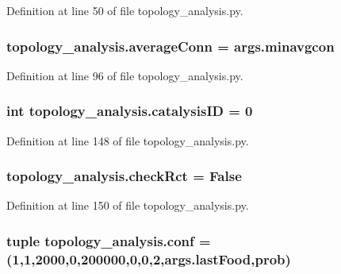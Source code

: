 Definition at line 50 of file topology\-\_\-analysis.\-py.

\hypertarget{a00157_a0d59133b2bb42e7aa26a3dba3a2a9a70}{
\subsubsection[{average\-Conn}]{\setlength{\rightskip}{0pt plus 5cm}topology\-\_\-analysis.\-average\-Conn = args.\-minavgcon}}\label{a00157_a0d59133b2bb42e7aa26a3dba3a2a9a70}


Definition at line 96 of file topology\-\_\-analysis.\-py.

\hypertarget{a00157_a35953bf84aa0f7a2a3ffa3f68190c0fa}{
\subsubsection[{catalysis\-I\-D}]{\setlength{\rightskip}{0pt plus 5cm}int topology\-\_\-analysis.\-catalysis\-I\-D = 0}}\label{a00157_a35953bf84aa0f7a2a3ffa3f68190c0fa}


Definition at line 148 of file topology\-\_\-analysis.\-py.

\hypertarget{a00157_a6f49caf3b9250cab918ae8dc5aef9931}{
\subsubsection[{check\-Rct}]{\setlength{\rightskip}{0pt plus 5cm}topology\-\_\-analysis.\-check\-Rct = False}}\label{a00157_a6f49caf3b9250cab918ae8dc5aef9931}


Definition at line 150 of file topology\-\_\-analysis.\-py.

\hypertarget{a00157_aa468c4ff92202c7d89fb631e8cb54dc8}{
\subsubsection[{conf}]{\setlength{\rightskip}{0pt plus 5cm}tuple topology\-\_\-analysis.\-conf = (1,1,2000,0,200000,0,0,2,args.\-last\-Food,{\bf prob})}}\label{a00157_aa468c4ff92202c7d89fb631e8cb54dc8}


